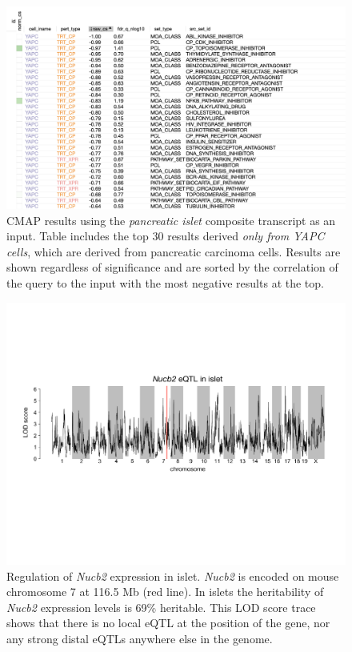 \documentclass[
]{article}
\begin{document}
\begin{figure}[ht!]
\includegraphics[width=\textwidth]{Figures/Supp_Fig_Islet_YAPC.png} 
\caption{CMAP results using the \textit{pancreatic islet} composite 
transcript as an input. Table includes the top 30 results derived
\textit{only from YAPC cells}, which are derived from pancreatic
carcinoma cells. Results are shown regardless of significance and
are sorted by the correlation of the query to the input 
with the most negative results at the top.
}
\label{fig:clue_islet_yapc}
\end{figure}

\begin{figure}[ht!]
\includegraphics[width=\textwidth]{Figures/Supplemental_FigX_Nucb2_eQTL.pdf} 
\caption{Regulation of \textit{Nucb2} expression in islet. \textit{Nucb2} 
is encoded on mouse chromosome 7 at 116.5 Mb (red line). In islets the 
heritability of \textit{Nucb2} expression levels is 69\% heritable. This 
LOD score trace shows that there is no local eQTL at the position of the
gene, nor any strong distal eQTLs anywhere else in the genome. 
}
\label{fig:Nucb2_eqtl}
\end{figure}

\clearpage



\end{document}
